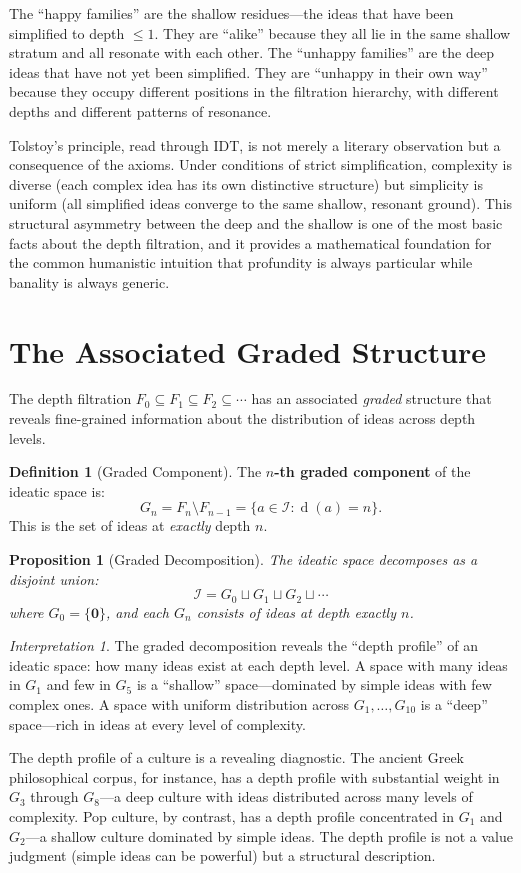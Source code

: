 \documentclass[11pt,openany]{book}
\theoremstyle{definition}
\newtheorem{definition}[axiom]{Definition}
\theoremstyle{plain}
\newtheorem{proposition}[axiom]{Proposition}
\theoremstyle{remark}
\newtheorem{interpretation}[axiom]{Interpretation}
\newcommand{\IS}{\mathcal{I}}               %
\newcommand{\void}{\mathbf{0}}              %
\newcommand{\depth}{\operatorname{d}}       %
\begin{document}
The ``happy families'' are the shallow residues---the ideas that have been simplified to depth $\leq 1$. They are ``alike'' because they all lie in the same shallow stratum and all resonate with each other. The ``unhappy families'' are the deep ideas that have not yet been simplified. They are ``unhappy in their own way'' because they occupy different positions in the filtration hierarchy, with different depths and different patterns of resonance.

Tolstoy's principle, read through IDT, is not merely a literary observation but a consequence of the axioms. Under conditions of strict simplification, complexity is diverse (each complex idea has its own distinctive structure) but simplicity is uniform (all simplified ideas converge to the same shallow, resonant ground). This structural asymmetry between the deep and the shallow is one of the most basic facts about the depth filtration, and it provides a mathematical foundation for the common humanistic intuition that profundity is always particular while banality is always generic.

\section{The Associated Graded Structure}

The depth filtration $F_0 \subseteq F_1 \subseteq F_2 \subseteq \cdots$ has an associated \emph{graded} structure that reveals fine-grained information about the distribution of ideas across depth levels.

\begin{definition}[Graded Component]
The \textbf{$n$-th graded component} of the ideatic space is:
\[
G_n = F_n \setminus F_{n-1} = \{a \in \IS : \depth(a) = n\}.
\]
This is the set of ideas at \emph{exactly} depth $n$.
\end{definition}

\begin{proposition}[Graded Decomposition]
The ideatic space decomposes as a disjoint union:
\[
\IS = G_0 \sqcup G_1 \sqcup G_2 \sqcup \cdots
\]
where $G_0 = \{\void\}$, and each $G_n$ consists of ideas at depth exactly $n$.
\end{proposition}

\begin{interpretation}
The graded decomposition reveals the ``depth profile'' of an ideatic space: how many ideas exist at each depth level. A space with many ideas in $G_1$ and few in $G_5$ is a ``shallow'' space---dominated by simple ideas with few complex ones. A space with uniform distribution across $G_1, \ldots, G_{10}$ is a ``deep'' space---rich in ideas at every level of complexity.

The depth profile of a culture is a revealing diagnostic. The ancient Greek philosophical corpus, for instance, has a depth profile with substantial weight in $G_3$ through $G_8$---a deep culture with ideas distributed across many levels of complexity. Pop culture, by contrast, has a depth profile concentrated in $G_1$ and $G_2$---a shallow culture dominated by simple ideas. The depth profile is not a value judgment (simple ideas can be powerful) but a structural description.
\end{interpretation}
\end{document}
